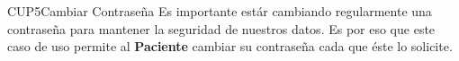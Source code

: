 \begin{UseCase}{CUP5}{Cambiar Contraseña}
    {
    	Es importante estár cambiando regularmente una contraseña para mantener la seguridad de nuestros datos. Es por eso que este caso de uso permite al \textbf{Paciente} cambiar su contraseña cada que éste lo solicite.
    }


\end{UseCase}
